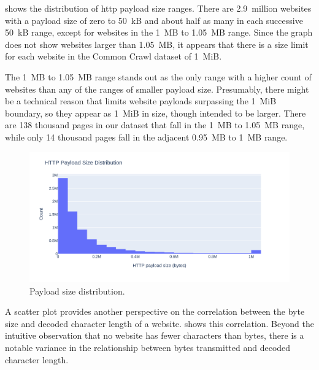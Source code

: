  shows the distribution of \ac{http} payload size ranges.
There are 2.9~million websites with a payload size of zero to 50~kB and about half as many in each successive 50~kB range, except for websites in the 1~MB to 1.05~MB range.
Since the graph does not show websites larger than 1.05~MB, it appears that there is a size limit for each website in the Common Crawl dataset of 1~MiB.

The 1~MB to 1.05~MB range stands out as the only range with a higher count of websites than any of the ranges of smaller payload size.
Presumably, there might be a technical reason that limits website payloads surpassing the 1~MiB boundary, so they appear as 1~MiB in size, though intended to be larger.
There are 138 thousand pages in our dataset that fall in the 1~MB to 1.05~MB range, while only 14 thousand pages fall in the adjacent 0.95~MB to 1~MB range.

\begin{figure}[H]
    \centering
    \includegraphics[width=\textwidth]{figures/charts/large/chart_source_payload_size_bar_count.png}
    \caption{Payload size distribution.}
    \label{fig:analysis-dataset-chart_source_payload_size_bar_count}
\end{figure}

A scatter plot provides another perspective on the correlation between the byte size and decoded character length of a website.
 shows this correlation.
Beyond the intuitive observation that no website has fewer characters than bytes, there is a notable variance in the relationship between bytes transmitted and decoded character length.

